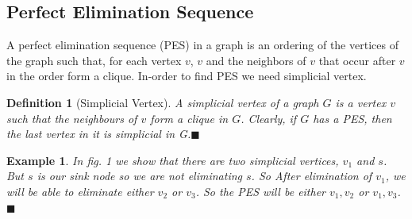 \documentclass[11pt]{article}
\newtheorem{lemma}[theorem]{Lemma}
\newtheorem*{defi}{Definition}
\newtheorem{exmp}{Example}[section]
\begin{document}
\subsection{Perfect Elimination Sequence}
A perfect elimination sequence (PES) in a graph is an ordering of the vertices of the graph such that, for each vertex $v$, $v$ and the neighbors of $v$ that occur after $v$ in the order form a clique. In-order to find PES we need simplicial vertex.
\begin{defi}[Simplicial Vertex]
\normalfont
A simplicial vertex of a graph $G$ is a vertex $v$ such that the neighbours of $v$ form a clique in $G$. Clearly, if $G$ has a PES, then the last vertex in it is simplicial in G.$\blacksquare$
\end{defi}

\begin{exmp}
\normalfont
In fig. 1 we show that there are two simplicial vertices, $v_1$ and $s$. But $s$ is our sink node so we are not eliminating $s$. So After elimination of $v_1$, we will be able to eliminate either $v_2$ or $v_3$. So the PES will be either $v_1,v_2$ or $v_1,v_3$.$\blacksquare$
\end{exmp}
\end{document}
